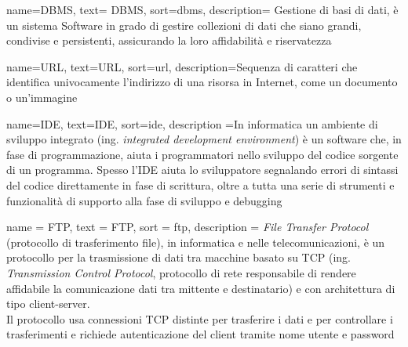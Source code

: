 
\label{cap:glossario}

    
%


{
	name={DBMS},
	text= DBMS,
	sort=dbms,
	description= {Gestione di basi di dati, è un sistema Software in grado di gestire collezioni di dati che siano grandi, condivise e persistenti, assicurando la loro affidabilità e riservatezza}
}

{
	name={URL},
    text=URL,
    sort=url,
    description={Sequenza di caratteri che identifica univocamente l'indirizzo di una risorsa in Internet, come un documento o un'immagine}
}

{
	name={IDE},
	text=IDE,
	sort=ide,
	description ={In informatica un ambiente di sviluppo integrato (ing. \textit{integrated development environment}) è un software che, in fase di programmazione, aiuta i programmatori nello sviluppo del codice sorgente di un programma. Spesso l'IDE aiuta lo sviluppatore segnalando errori di sintassi del codice direttamente in fase di scrittura, oltre a tutta una serie di strumenti e funzionalità di supporto alla fase di sviluppo e debugging}
}

{
	name = FTP,
	text = FTP,
	sort = ftp,
	description = {\textit{File Transfer Protocol} (protocollo di trasferimento file), in informatica e nelle telecomunicazioni, è un protocollo per la trasmissione di dati tra macchine basato su TCP (ing. \textit{Transmission Control Protocol}, protocollo di rete responsabile di rendere affidabile la comunicazione dati tra mittente e destinatario) e con architettura di tipo client-server.\\
Il protocollo usa connessioni TCP distinte per trasferire i dati e per controllare i trasferimenti e richiede autenticazione del client tramite nome utente e password}
}

